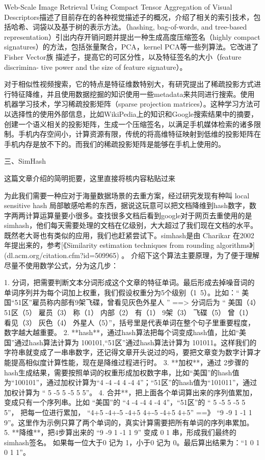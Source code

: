 Web-Scale Image Retrieval Using Compact Tensor Aggregation of Visual Descriptors\cite{Negrel:2013ur}描述了目前存在的各种视觉描述子的概况，介绍了相关的索引技术，包括哈希、词袋以及基于树的表示方法。（hashing, bag-of-words, and tree-based representation）引出内存开销问题并提出一种生成高度压缩签名（highly compact signatures）的方法，包括张量聚合，PCA，kernel PCA等一些列算法。它改进了Fisher Vector族 描述子，提高它的可区分性，以及特征签名的大小（feature discrimina- tive power and the size of feature signature）。

对于相似性视频搜索，它的特点是特征维数特别大，有研究提出了稀疏投影方式进行特征降维，并且使用数据挖掘的知识使用一些metadata来共同进行搜索\cite{Wu:2013tb}。使用机器学习技术，学习稀疏投影矩阵（sparse projection matrices）。这种学习方法可以选择性的使用外部信息，比如WikiPedia上的知识和Google搜索结果中的摘要，创建一个语义相关的投影矩阵，生成一个压缩签名，以满足手机媒体检索的诸多限制。手机内存空间小，计算资源有限，传统的将高维特征映射到低维的投影矩阵在手机内存是放不下的。而我们的稀疏投影矩阵是能够在手机上使用的。


三、SimHash


这篇文章介绍的简明扼要，这里直接将核内容粘贴过来

为此我们需要一种应对于海量数据场景的去重方案，经过研究发现有种叫 local sensitive hash 局部敏感哈希的东西，据说这玩意可以把文档降维到hash数字，数字两两计算运算量要小很多。查找很多文档后看到google对于网页去重使用的是simhash，他们每天需要处理的文档在亿级别，大大超过了我们现在文档的水平。既然老大哥也有类似的应用，我们也赶紧尝试下。simhash是由 Charikar 在2002年提出来的，参考[《Similarity estimation techniques from rounding algorithms》](dl.acm.org/citation.cfm?id=509965) 。 介绍下这个算法主要原理，为了便于理解尽量不使用数学公式，分为这几步：

1. 分词，把需要判断文本分词形成这个文章的特征单词。最后形成去掉噪音词的单词序列并为每个词加上权重，我们假设权重分为5个级别（1~5）。比如：“ 美国“51区”雇员称内部有9架飞碟，曾看见灰色外星人 ” ==> 分词后为 “ 美国（4） 51区（5） 雇员（3） 称（1） 内部（2） 有（1） 9架（3） 飞碟（5） 曾（1） 看见（3） 灰色（4） 外星人（5）”，括号里是代表单词在整个句子里重要程度，数字越大越重要。
2. **hash**，通过hash算法把每个词变成hash值，比如“美国”通过hash算法计算为 100101,“51区”通过hash算法计算为 101011。这样我们的字符串就变成了一串串数字，还记得文章开头说过的吗，要把文章变为数字计算才能提高相似度计算性能，现在是降维过程进行时。
3. **加权**，通过 2步骤的hash生成结果，需要按照单词的权重形成加权数字串，比如“美国”的hash值为“100101”，通过加权计算为“4 -4 -4 4 -4 4”；“51区”的hash值为“101011”，通过加权计算为 “ 5 -5 5 -5 5 5”。
4. 合并**，把上面各个单词算出来的序列值累加，变成只有一个序列串。比如 “美国”的 “4 -4 -4 4 -4 4”，“51区”的 “ 5 -5 5 -5 5 5”， 把每一位进行累加， “4+5 -4+-5 -4+5 4+-5 -4+5 4+5” ==》 “9 -9 1 -1 1 9”。这里作为示例只算了两个单词的，真实计算需要把所有单词的序列串累加。
5. **降维**，把4步算出来的 “9 -9 1 -1 1 9” 变成 0 1 串，形成我们最终的simhash签名。 如果每一位大于0 记为 1，小于0 记为 0。最后算出结果为：“1 0 1 0 1 1”。


